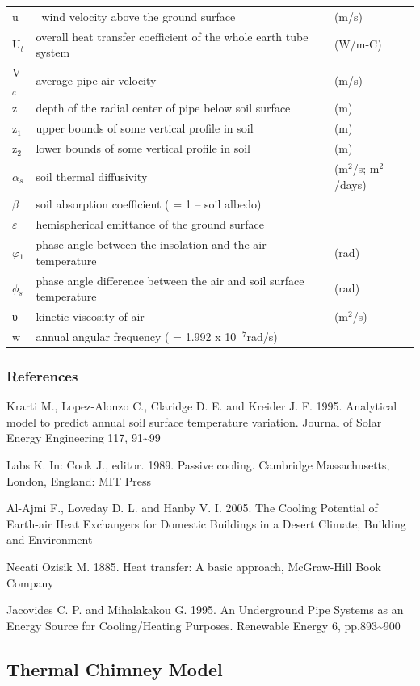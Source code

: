 \begin{longtable}[c]{p{1.0in}p{3.5in}p{1.5in}}
u & ~wind velocity above the ground surface & (m/s) \tabularnewline
U\(_{t}\) & overall heat transfer coefficient of the whole earth tube system & (W/m-C) \tabularnewline
V\(_{a}\) & average pipe air velocity & (m/s) \tabularnewline
z & depth of the radial center of pipe below soil surface & (m) \tabularnewline
z\(_{1}\) & upper bounds of some vertical profile in soil & (m) \tabularnewline
z\(_{2}\) & lower bounds of some vertical profile in soil & (m) \tabularnewline
$\alpha$\(_{s}\) & soil thermal diffusivity & (m\(^{2}\)/s; m\(^{2}\)/days) \tabularnewline
$\beta$ & soil absorption coefficient ( = 1 – soil albedo) & ~ \tabularnewline
$\varepsilon$ & hemispherical emittance of the ground surface & ~ \tabularnewline
$\varphi$\(_{1}\) & phase angle between the insolation and the air temperature & (rad) \tabularnewline
$\phi$\(_{s}\) & phase angle difference between the air and soil surface temperature & (rad) \tabularnewline
υ & kinetic viscosity of air & (m\(^{2}\)/s) \tabularnewline
w & annual angular frequency ( = 1.992 x 10\(^{-7}\)rad/s) & ~ \tabularnewline
\bottomrule
\end{longtable}

\subsubsection{References}\label{references-6-000}

Krarti M., Lopez-Alonzo C., Claridge D. E. and Kreider J. F. 1995. Analytical model to predict annual soil surface temperature variation. Journal of Solar Energy Engineering 117, 91\textasciitilde{}99

Labs K. In: Cook J., editor. 1989. Passive cooling. Cambridge Massachusetts, London, England: MIT Press

Al-Ajmi F., Loveday D. L. and Hanby V. I. 2005. The Cooling Potential of Earth-air Heat Exchangers for Domestic Buildings in a Desert Climate, Building and Environment

Necati Ozisik M. 1885. Heat transfer: A basic approach, McGraw-Hill Book Company

Jacovides C. P. and Mihalakakou G. 1995. An Underground Pipe Systems as an Energy Source for Cooling/Heating Purposes. Renewable Energy 6, pp.893\textasciitilde{}900

\subsection{Thermal Chimney Model}\label{thermal-chimney-model}

